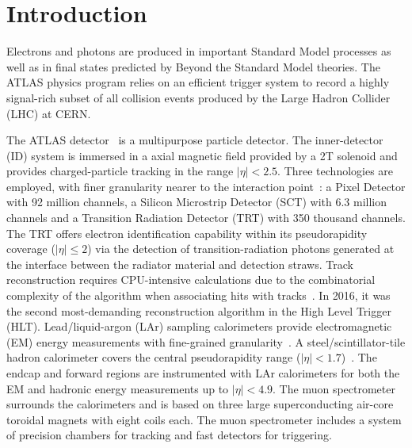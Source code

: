 \chapter{Introduction}

Electrons and photons are produced in important Standard Model processes as well as in final states predicted by Beyond the Standard Model theories. 
The ATLAS physics program relies on an efficient trigger system to record a highly signal-rich subset of all collision events produced by the Large Hadron Collider (LHC) at CERN.

The ATLAS detector~\cite{PERF-2007-01} is a multipurpose particle detector. 
The inner-detector (ID) system is immersed in a axial magnetic field provided by a 2T solenoid and provides charged-particle tracking in the range $|\eta|<2.5$.  
Three technologies are employed, with finer granularity nearer to the interaction point~\cite{PERF-2015-08,CERN-LHCC-97-016,Haywood:331064}: a Pixel Detector with 92 million channels, a Silicon Microstrip Detector (SCT) with 6.3 million channels and a Transition Radiation Detector (TRT) with 350 thousand channels. 
The TRT offers electron identification capability within its pseudorapidity coverage ($|\eta|\leq 2$) via the detection of transition-radiation photons generated at the interface between the radiator material and detection straws. 
Track reconstruction requires CPU-intensive calculations due to the combinatorial complexity of the algorithm when associating hits with tracks~\cite{PERF-2015-08}. 
In 2016, it was the second most-demanding reconstruction algorithm in the High Level Trigger (HLT).
Lead/liquid-argon (LAr) sampling calorimeters provide electromagnetic (EM) energy measurements with fine-grained granularity~\cite{LARG-2009-01,larg_tdr}. 
A steel/scintillator-tile hadron calorimeter covers the central pseudorapidity range ($|\eta|< 1.7$)~\cite{TCAL-2017-01,tile_tdr}. 
The endcap and forward regions are instrumented with LAr calorimeters for both the EM and hadronic energy measurements up to $|\eta|< 4.9$. 
The muon spectrometer surrounds the calorimeters and is based on three large superconducting air-core toroidal magnets with eight coils each.  
The muon spectrometer includes a system of precision chambers for tracking and fast detectors for triggering. 


